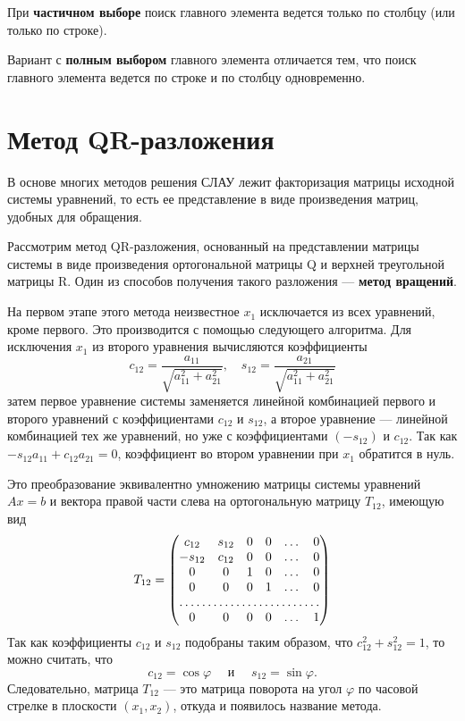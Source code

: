 \documentclass[12pt, a4paper]{article}
\begin{document}
	При \textbf{частичном выборе} поиск главного элемента ведется только по столбцу (или только по строке). 	
	
	Вариант с \textbf{полным выбором} главного элемента отличается тем, что поиск главного элемента ведется по строке и по столбцу одновременно.
	\section{Метод QR-разложения}
	В основе многих методов решения СЛАУ лежит факторизация матрицы исходной системы уравнений, то есть ее представление в виде произведения матриц, удобных для обращения.
	
	Рассмотрим метод QR-разложения, основанный на представлении матрицы системы в виде произведения ортогональной матрицы Q и верхней треугольной матрицы R. Один из способов получения такого разложения — \textbf{метод вращений}.
	
	На первом этапе этого метода неизвестное $x_1$ исключается
	из всех уравнений, кроме первого. Это производится с помощью	следующего алгоритма. Для исключения $x_1$ из второго уравнения вычисляются коэффициенты
	\[
	c_{12}=\frac{a_{11}}{\sqrt{a_{11}^2 + a_{21}^2}},\quad
	s_{12}=\frac{a_{21}}{\sqrt{a_{11}^2 + a_{21}^2}}
	\]
	затем первое уравнение системы заменяется линейной комбинацией первого и второго уравнений с коэффициентами $c_{12}$ и $s_{12}$, а второе уравнение — линейной комбинацией тех же уравнений, но уже с коэффициентами $(-s_{12})$ и $c_{12}$. Так как $-s_{12} a_{11} + c_{12} a_{21} =0$,
	коэффициент во втором уравнении при $x_1$ обратится в нуль.
	
	Это преобразование эквивалентно умножению матрицы системы уравнений $Ax=b$ и вектора правой части слева на ортогональную матрицу $T_{12}$, имеющую вид
	\[
	T_{12}=
	\begin{pmatrix}
		c_{12} & s_{12} & 0 & 0 & \dots & 0\\
		-s_{12} & c_{12} & 0 & 0 & \dots & 0\\
		0 & 0 & 1 & 0 &  \dots & 0\\
		0 & 0 & 0 & 1 &  \dots & 0\\
		\hdotsfor{6}\\
		0 & 0 & 0 & 0 &  \dots & 1
	\end{pmatrix}
	\]
	Так как коэффициенты $c_{12}$ и $s_{12}$ подобраны таким образом,
	что $c_{12}^2+s_{12}^2=1$, то можно считать, что
	\[
	c_{12}=\cos{\varphi}\quad \text{ и }\quad s_{12}=\sin{\varphi}. 
	\]
	Следовательно, матрица $T_{12}$ — это матрица поворота на угол $\varphi$ по часовой стрелке в плоскости $(x_1,x_2)$, откуда и появилось название метода.
	
\end{document}
